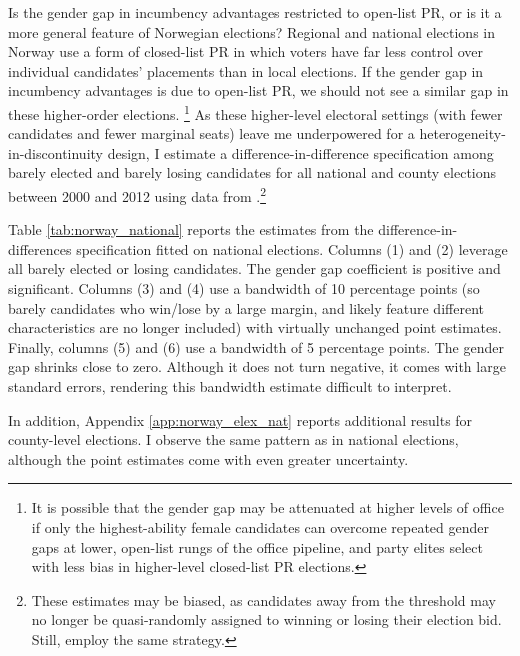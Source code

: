 \documentclass[12pt]{article}
\begin{document}
Is the gender gap in incumbency advantages restricted to open-list PR, or is it a more general feature of Norwegian elections? Regional and national elections in Norway use a form of closed-list PR in which voters have far less control over individual candidates' placements than in local elections. If the gender gap in incumbency advantages is due to open-list PR, we should not see a similar gap in these higher-order elections. \footnote{It is possible that the gender gap may be attenuated at higher levels of office if only the highest-ability female candidates can overcome repeated gender gaps at lower, open-list rungs of the office pipeline, and party elites select with less bias in higher-level closed-list PR elections.
     }
As these higher-level electoral settings (with fewer candidates and fewer marginal seats) leave me underpowered for a heterogeneity-in-discontinuity design, I estimate a difference-in-difference specification among barely elected and barely losing candidates for all national and county elections between 2000 and 2012 using data from \citet{fiva2018c}.\footnote{These estimates may be biased, as candidates away from the threshold may no longer be quasi-randomly assigned to winning or losing their election bid. Still, \citet{fiva2016} employ the same strategy.
}

Table \ref{tab:norway_national} reports the estimates from the difference-in-differences specification fitted on national elections. Columns (1) and (2) leverage all barely elected or losing candidates. The gender gap coefficient is positive and significant. Columns (3) and (4) use a bandwidth of 10 percentage points (so barely candidates who win/lose by a large margin, and likely feature different characteristics are no longer included) with virtually unchanged point estimates. Finally, columns (5) and (6) use a bandwidth of 5 percentage points. The gender gap shrinks close to zero. Although it does not turn negative, it comes with large standard errors, rendering this bandwidth estimate difficult to interpret.

In addition, Appendix \ref{app:norway_elex_nat} reports additional results for county-level elections. I observe the same pattern as in national elections, although the point estimates come with even greater uncertainty.
\end{document}
